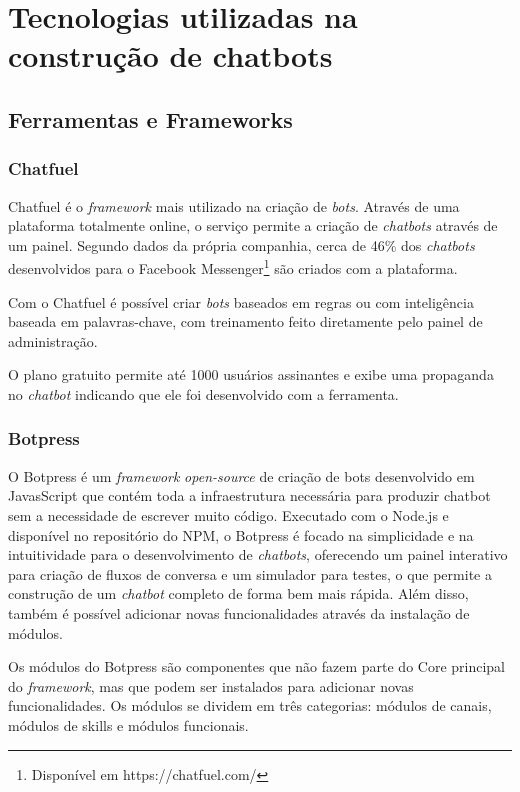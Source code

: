   \chapter{Tecnologias utilizadas na construção de chatbots}
  
  \section{Ferramentas e Frameworks}
  \subsection{Chatfuel}
  Chatfuel é o \textit{framework} mais utilizado na criação de \textit{bots}. Através de uma plataforma totalmente online, o serviço permite a criação de \textit{chatbots} através de um painel. Segundo dados da própria companhia, cerca de 46\% dos \textit{chatbots} desenvolvidos para o Facebook Messenger\footnote{Disponível em https://chatfuel.com/} são criados com a plataforma.
  
  Com o Chatfuel é possível criar \textit{bots} baseados em regras ou com inteligência baseada em palavras-chave, com treinamento feito diretamente pelo painel de administração.
  
  O plano gratuito permite até 1000 usuários assinantes e exibe uma propaganda no \textit{chatbot} indicando que ele foi desenvolvido com a ferramenta.
  
  \subsection{Botpress}
   O Botpress é um \emph{framework} \emph{open-source} de criação de bots desenvolvido em JavasScript que contém toda a infraestrutura necessária para produzir chatbot sem a necessidade de escrever muito código. Executado com o Node.js e disponível no repositório do NPM, o Botpress é focado na simplicidade e na intuitividade para o desenvolvimento de \textit{chatbots}, oferecendo um painel interativo para criação de fluxos de conversa e um simulador para testes, o que permite a construção de um \textit{chatbot} completo de forma bem mais rápida. Além disso, também é possível adicionar novas funcionalidades através da instalação de módulos.
  
   Os módulos do Botpress são componentes que não fazem parte do Core principal do \textit{framework}, mas que podem ser instalados para adicionar novas funcionalidades. Os módulos se dividem em três categorias: módulos de canais, módulos de skills e módulos funcionais.
  

